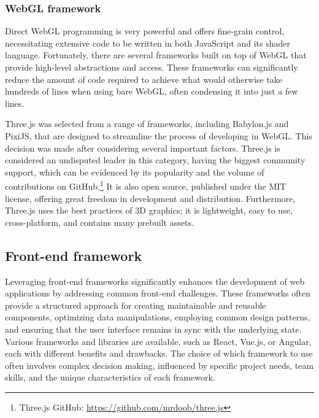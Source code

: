 \subsubsection{WebGL framework}
\label{section:WebGL}
Direct WebGL programming is very powerful and offers fine-grain control, necessitating extensive code to be written in both JavaScript and its shader language. Fortunately, there are several frameworks built on top of WebGL that provide high-level abstractions and access. These frameworks can significantly reduce the amount of code required to achieve what would otherwise take hundreds of lines when using bare WebGL, often condensing it into just a few lines. \cite{Parisi2014}

Three.js was selected from a range of frameworks, including Babylon.js and PixiJS, that are designed to streamline the process of developing in WebGL. This decision was made after considering several important factors.
Three.js is considered an undisputed leader in this category, having the biggest community support, which can be evidenced by its popularity and the volume of contributions on GitHub.\footnote{Three.js GitHub: \url{https://github.com/mrdoob/three.js}} It is also open source, published under the MIT license, offering great freedom in development and distribution. Furthermore, Three.js uses the best practices of 3D graphics; it is lightweight, easy to use, cross-platform, and contains many prebuilt assets. \cite{Parisi2014} \cite{ThreeJs} \cite{BabylonJs} \cite{PixiJS}


\subsection{Front-end framework}

Leveraging front-end frameworks significantly enhances the development of web applications by addressing common front-end challenges. These frameworks often provide a structured approach for creating maintainable and reusable components, optimizing data manipulations, employing common design patterns, and ensuring that the user interface remains in sync with the underlying state. Various frameworks and libraries are available, such as React, Vue.js, or Angular, each with different benefits and drawbacks. The choice of which framework to use often involves complex decision making, influenced by specific project needs, team skills, and the unique characteristics of each framework. \cite{Gimeno2018} \cite{Pekarsky2020}

